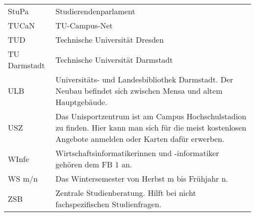 \begin{longtable}{p{20mm}p{85mm}}
    StuPa        & Studierendenparlament                                                                                                                                                                                                                                                   \\
    TUCaN        & TU-Campus-Net                                                                                                                                                                                                                                                           \\
    TUD          & Technische Universität Dresden                                                                                                                                                                                                                                          \\
    TU Darmstadt & Technische Universität Darmstadt                                                                                                                                                                                                                                        \\
    ULB          & Universitäts- und Landesbibliothek Darmstadt. Der Neubau befindet sich zwischen Mensa und altem Hauptgebäude.                                                                                                                                                           \\
    USZ          & Das Unisportzentrum ist am Campus Hochschulstadion zu finden. Hier kann man sich für die meist kostenlosen Angebote anmelden oder Karten dafür erwerben.                                                                                                                \\
    WInfe        & Wirtschaftsinformatikerinnen und -informatiker gehören dem FB 1 an.                                                                                                                                                                                                     \\
    WS m/n       & Das Wintersemester von Herbst m bis Frühjahr n.                                                                                                                                                                                                                         \\
    ZSB          & Zentrale Studienberatung. Hilft bei nicht fachspezifischen Studienfragen.                                                                                                                                                                                               \\
\end{longtable}

\newpage
